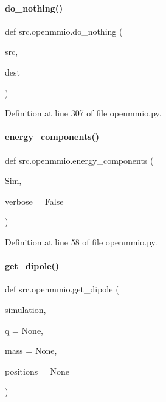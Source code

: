 \paragraph{\texorpdfstring{do\+\_\+nothing()}{do\_nothing()}}
{\footnotesize\ttfamily def src.\+openmmio.\+do\+\_\+nothing (\begin{DoxyParamCaption}\item[{}]{src,  }\item[{}]{dest }\end{DoxyParamCaption})}



Definition at line 307 of file openmmio.\+py.

\mbox{\label{namespacesrc_1_1openmmio_a507e4cd5f30d91e2050f64294a63c988}} 
\paragraph{\texorpdfstring{energy\+\_\+components()}{energy\_components()}}
{\footnotesize\ttfamily def src.\+openmmio.\+energy\+\_\+components (\begin{DoxyParamCaption}\item[{}]{Sim,  }\item[{}]{verbose = {\ttfamily False} }\end{DoxyParamCaption})}



Definition at line 58 of file openmmio.\+py.

\mbox{\label{namespacesrc_1_1openmmio_a8b766c129297cc81c86b244f7bc56dac}} 
\paragraph{\texorpdfstring{get\+\_\+dipole()}{get\_dipole()}}
{\footnotesize\ttfamily def src.\+openmmio.\+get\+\_\+dipole (\begin{DoxyParamCaption}\item[{}]{simulation,  }\item[{}]{q = {\ttfamily None},  }\item[{}]{mass = {\ttfamily None},  }\item[{}]{positions = {\ttfamily None} }\end{DoxyParamCaption})}



